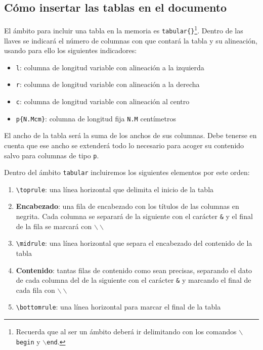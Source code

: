 \subsection{Cómo insertar las tablas en el documento}

El ámbito para incluir una tabla en la memoria es \verb|tabular{}|\footnote{Recuerda que al ser un ámbito deberá ir delimitando con los comandos \texttt{$\backslash$begin} y \texttt{$\backslash$end}.}. Dentro de las llaves se indicará el número de columnas con que contará la tabla y su alineación, usando para ello los siguientes indicadores:

\begin{itemize}
    \item \texttt{l}: columna de longitud variable con alineación a la izquierda
    \item \texttt{r}: columna de longitud variable con alineación a la derecha
    \item \texttt{c}: columna de longitud variable con alineación al centro
    \item \texttt{p\{N.Mcm\}}: columna de longitud fija \texttt{N.M} centímetros
\end{itemize}

El ancho de la tabla será la suma de los anchos de sus columnas. Debe tenerse en cuenta que ese ancho se extenderá todo lo necesario para acoger su contenido salvo para columnas de tipo \texttt{p}.

Dentro del ámbito \texttt{tabular} incluiremos los siguientes elementos por este orden:

\begin{enumerate}
    \item \verb|\toprule|: una línea horizontal que delimita el inicio de la tabla
    \item \textbf{Encabezado}: una fila de encabezado con los títulos de las columnas en negrita. Cada columna se separará de la siguiente con el carácter \texttt{\&} y el final de la fila se marcará con \texttt{$\backslash\backslash$}
    \item \verb|\midrule|: una línea horizontal que separa el encabezado del contenido de la tabla
    \item \textbf{Contenido}: tantas filas de contenido como sean precisas, separando el dato de cada columna del de la siguiente con el carácter \texttt{\&} y marcando el final de cada fila con \texttt{$\backslash\backslash$}
    \item \verb|\bottomrule|: una línea horizontal para marcar el final de la tabla
\end{enumerate}

